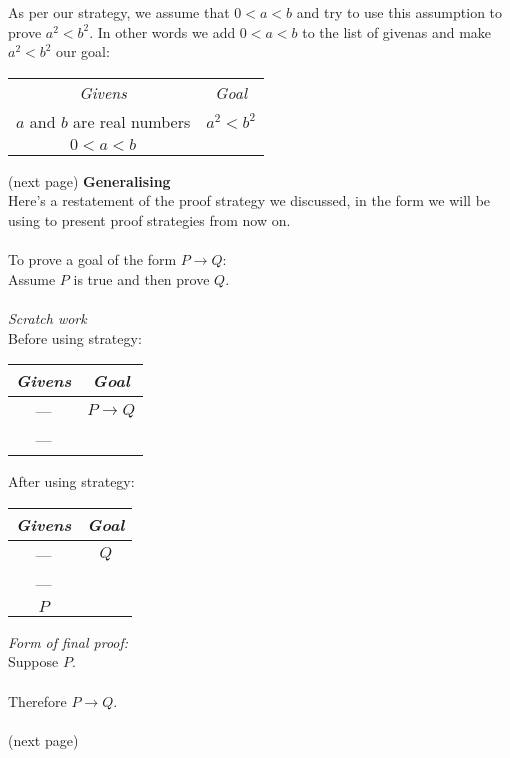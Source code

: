 \documentclass{report}
\begin{document}
As per our strategy, we assume that $0<a<b$ and try to use this assumption to prove $a^2<b^2$. In other words we add $0<a<b$ to the list of givenas and make $a^2<b^2$ our goal:
\begin{center}
\begin{tabular}{c|c}
\textit{Givens}&\textit{Goal}\\
$a$ and $b$ are real numbers&$a^2<b^2$\\
$0<a<b$&
\end{tabular}
\end{center}
(next page)\newpage
\noindent\textbf{Generalising}\\
Here's a restatement of the proof strategy we discussed, in the form we will be using to present proof strategies from now on.\\
\vspace{1mm}\\
\indent To prove a goal of the form $P\to Q$:\\
\indent Assume $P$ is true and then prove $Q$.\\
\vspace{1mm}\\
\textit{Scratch work}\\
Before using strategy:
\begin{center}
\begin{tabular}{c|c}
\textit{Givens}&\textit{Goal}\\
\hline
---&$P\to Q$\\
---&
\end{tabular}
\end{center}
After using strategy:
\begin{center}
\begin{tabular}{c|c}
\textit{Givens}&\textit{Goal}\\
\hline
---&$Q$\\
---&\\
$P$&
\end{tabular}
\end{center}
\textit{Form of final proof:}\\
\indent Suppose $P$.\\
\indent{}\\
\indent Therefore $P\to Q$.\\
\vspace{1mm}\\
(next page)\newpage
\end{document}
